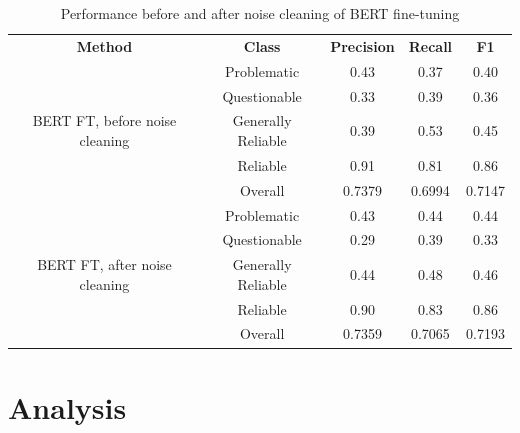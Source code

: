 \begin{table}[htbp]
    \centering
    \scriptsize
    \begin{tabular}{| c | c | c | c | c |}
        \hline                            \textbf{Method} & \textbf{Class}     & \textbf{Precision} & \textbf{Recall} & \textbf{F1} \\\cline{1-5}

        \multirow{5}{*}{BERT FT, before noise cleaning}   & Problematic        & 0.43               & 0.37            & 0.40        \\
                                                          & Questionable       & 0.33               & 0.39            & 0.36        \\
                                                          & Generally Reliable & 0.39               & 0.53            & 0.45        \\
                                                          & Reliable           & 0.91               & 0.81            & 0.86        \\\cline{2-5}
                                                          & Overall            & 0.7379             & 0.6994          & 0.7147      \\
        \hline
        \multirow{5}{*}{BERT FT, after noise cleaning}    & Problematic        & 0.43               & 0.44            & 0.44        \\
                                                          & Questionable       & 0.29               & 0.39            & 0.33        \\
                                                          & Generally Reliable & 0.44               & 0.48            & 0.46        \\
                                                          & Reliable           & 0.90               & 0.83            & 0.86        \\\cline{2-5}
                                                          & Overall            & 0.7359             & 0.7065          & 0.7193      \\
        \hline
    \end{tabular}
    \caption{Performance before and after noise cleaning of BERT fine-tuning}
    \label{table:noise_performance_comparison}
\end{table}


\section{Analysis}

